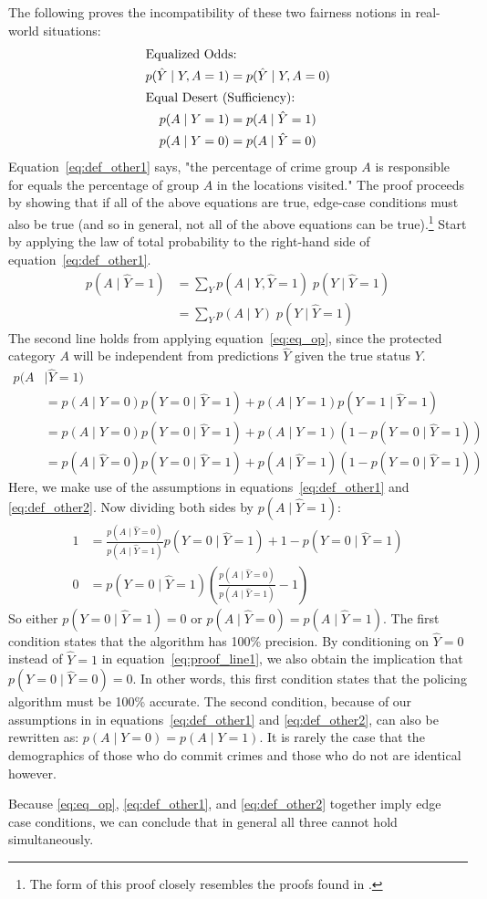 The following proves the incompatibility of these two fairness notions in real-world situations:
\begin{align}
\intertext{Equalized Odds:}
p(\hat{Y} \mid Y, A = 1) &= p(\hat{Y} \mid Y, A = 0) \label{eq:eq_op}\\
\intertext{Equal Desert (Sufficiency):}
p(A \mid Y = 1) &= p(A \mid \hat{Y} = 1) \label{eq:def_other1}\\
p(A \mid Y = 0) &= p(A \mid \hat{Y} = 0) \label{eq:def_other2}
\end{align}
Equation~\ref{eq:def_other1} says, "the percentage of crime group $A$ is responsible for equals the percentage of group $A$ in the locations visited." The proof proceeds by showing that if all of the above equations are true, edge-case conditions must also be true (and so in general, not all of the above equations can be true).\footnote{The form of this proof closely resembles the proofs found in \citet{barocas_fairness_2018}.} Start by applying the law of total probability to the right-hand side of equation~\ref{eq:def_other1}.
\begin{align}
p(A \mid \hat{Y} = 1) &= \sum_{Y} p(A \mid Y, \hat{Y} = 1) \; p(Y \mid \hat{Y} = 1) \label{eq:proof_line1}\\
&= \sum_{Y} p(A \mid Y) \; p(Y \mid \hat{Y} = 1)
\end{align}
The second line holds from applying equation~\ref{eq:eq_op}, since the protected category $A$ will be independent from predictions $\hat{Y}$ given the true status $Y$.
\begin{align}
p(A &\mid \hat{Y} = 1)\\
&= p(A \mid Y = 0)p(Y = 0 \mid \hat{Y} = 1) + p(A \mid Y = 1)p(Y = 1 \mid \hat{Y} = 1)\\
&= p(A \mid Y = 0)p(Y = 0 \mid \hat{Y} = 1) + p(A \mid Y = 1)(1 - p(Y = 0 \mid \hat{Y} = 1))\\
&= p(A \mid \hat{Y} = 0)p(Y = 0 \mid \hat{Y} = 1) + p(A \mid \hat{Y} = 1)(1 - p(Y = 0 \mid \hat{Y} = 1))
\end{align}
Here, we make use of the assumptions in equations~\ref{eq:def_other1} and
\ref{eq:def_other2}. Now dividing both sides by $p(A \mid \hat{Y} = 1)$:
\begin{align}
1 &= \frac{p(A \mid \hat{Y} = 0)}{p(A \mid \hat{Y} = 1)}p(Y = 0 \mid \hat{Y} = 1) + 1 - p(Y = 0 \mid \hat{Y} = 1)\\
0 &= p(Y = 0 \mid \hat{Y} = 1) \left(\frac{p(A \mid \hat{Y} = 0)}{p(A \mid \hat{Y} = 1)} - 1\right)
\end{align}
So either $p(Y = 0 \mid \hat{Y} = 1) = 0$ or $p(A \mid \hat{Y} = 0) = p(A \mid
\hat{Y} = 1)$. The first condition states that the algorithm has 100\%
precision. By conditioning on $\hat{Y} = 0$ instead of $\hat{Y} = 1$ in
equation~\ref{eq:proof_line1}, we also obtain the implication that $p(Y = 0
\mid \hat{Y} = 0) = 0$. In other words, this first condition states that the
policing algorithm must be 100\% accurate. The second condition, because of our
assumptions in in equations~\ref{eq:def_other1} and \ref{eq:def_other2}, can
also be rewritten as: $p(A \mid Y = 0) = p(A \mid Y = 1)$. It is rarely the case that the demographics of those who do commit crimes and those who do not are identical however.

Because \autoref{eq:eq_op}, \autoref{eq:def_other1}, and \autoref{eq:def_other2} together imply edge case conditions, we can conclude that in general all three cannot hold simultaneously.
